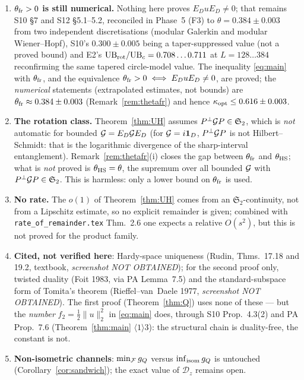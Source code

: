 \documentclass[11pt]{article}
\newcommand{\Stwo}{\mathfrak S_2}\newcommand{\Sone}{\mathfrak S_1}
\newcommand{\norm}[1]{\lVert #1\rVert}\newcommand{\abs}[1]{\lvert #1\rvert}
\begin{document}
\begin{verdictgap}
\begin{enumerate}[leftmargin=1.6em,itemsep=1pt]
\item \textbf{$\theta_{\rm fr}>0$ is still numerical.}  Nothing here proves
 $E_DuE_D\ne0$; that remains S10 \S7 and S12 \S5.1--5.2, reconciled in Phase~5 (F3) to
 $\theta=0.384\pm0.003$ from two independent discretisations (modular Galerkin and modular
 Wiener--Hopf), S10's $0.300\pm0.005$ being a taper-suppressed value (not a proved bound) and E2's
 $\mathrm{UB}_{\rm rot}/\mathrm{UB}_c=0.708\ldots0.711$ at $L=128\ldots384$ reconfirming the
 same tapered circle-model value.  The inequality \eqref{eq:main} with
 $\theta_{\rm fr}$, and the equivalence $\theta_{\rm fr}>0\iff E_DuE_D\ne0$, are proved; the
 \emph{numerical} statements (extrapolated estimates, not bounds) are $\theta_{\rm fr}\approx0.384\pm0.003$ (Remark~\ref{rem:thetafr}) and hence
 $\kappa_{\rm opt}\le0.616\pm0.003$.
\item \textbf{The rotation class.}  Theorem~\ref{thm:UH} assumes $\Pperp\Gs P\in\Stwo$, which is
 \emph{not} automatic for bounded $\mathcal G=E_D\mathcal G E_D$ (for $\mathcal G=i\mathbf 1_D$, $P^{\perp}\mathcal G P$ is not
 Hilbert--Schmidt: that is the logarithmic divergence of the sharp-interval entanglement).
 Remark~\ref{rem:thetafr}(i) closes the gap between $\theta_{\rm fr}$ and $\theta_{\rm HS}$;
 what is \emph{not} proved is $\theta_{\rm HS}=\theta$, the supremum over all bounded $\mathcal G$ with
 $\Pperp\Gs P\in\Stwo$.  This is harmless: only a lower bound on $\theta_{\rm fr}$ is used.
\item \textbf{No rate.}  The $o(1)$ of Theorem~\ref{thm:UH} comes from an $\Stwo$-continuity, not
 from a Lipschitz estimate, so no explicit remainder is given; combined with
 \texttt{rate\_of\_remainder.tex} Thm.~2.6 one expects a relative $O(s^2)$, but this is not proved
 for the product family.
\item \textbf{Cited, not verified here}: Hardy-space uniqueness (Rudin, Thms.~17.18 and 19.2,
 textbook, \emph{screenshot NOT OBTAINED}); for the second proof only, twisted duality (Foit 1983,
 via PA Lemma~7.5) and the standard-subspace form of Tomita's theorem (Rieffel--van~Daele 1977,
 \emph{screenshot NOT OBTAINED}).  The first proof (Theorem~\ref{thm:Q}) uses none of these ---
 but the \emph{number} $f_2=\tfrac12\norm u_2^2$ in \eqref{eq:main} does, through S10
 Prop.~4.3(2) and PA Prop.~7.6 (Theorem~\ref{thm:main} $\langle1\rangle3$): the structural chain
 is duality-free, the constant is not.
\item \textbf{Non-isometric channels}: $\min_\mathcal F g_Q$ versus $\inf_{\rm isom}g_Q$ is untouched
 (Corollary~\ref{cor:sandwich}); the exact value of $\mathcal D_z$ remains open.
\end{enumerate}
\end{verdictgap}
\end{document}
